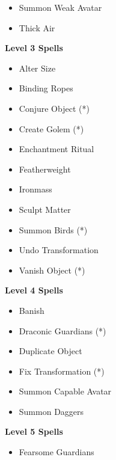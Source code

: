 \begin{multicols}{4}
{\begin{itemize}[itemsep=0em]
\item Summon Weak Avatar

\item Thick Air


\end{itemize}
\textbf{Level 3 Spells}
\begin{itemize}[itemsep=0em]
\renewcommand\labelitemi{-}
\item Alter Size

\item Binding Ropes

\item Conjure Object (*) 

\item Create Golem (*) 

\item Enchantment Ritual

\item Featherweight

\item Ironmass

\item Sculpt Matter

\item Summon Birds (*) 

\item Undo Transformation

\item Vanish Object (*) 


\end{itemize}
\textbf{Level 4 Spells}
\begin{itemize}[itemsep=0em]
\renewcommand\labelitemi{-}
\item Banish

\item Draconic Guardians (*) 

\item Duplicate Object

\item Fix Transformation (*) 

\item Summon Capable Avatar

\item Summon Daggers


\end{itemize}
\textbf{Level 5 Spells}
\begin{itemize}[itemsep=0em]
\renewcommand\labelitemi{-}
\item Fearsome Guardians


\end{itemize}}
\end{multicols}
